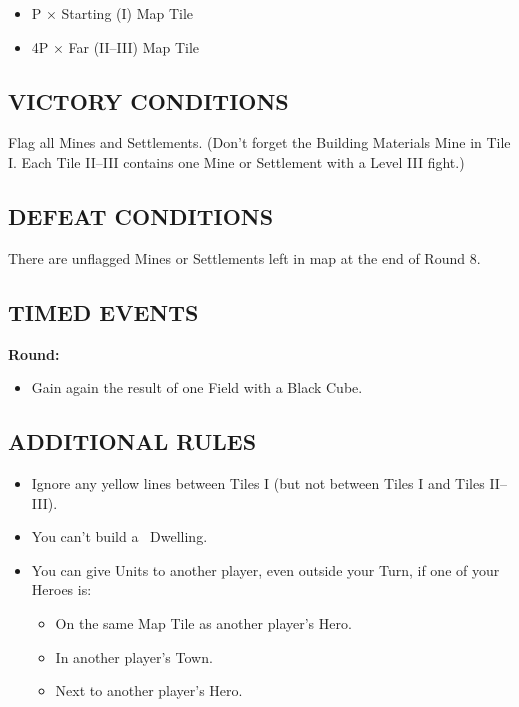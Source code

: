 \begin{multicols}{2}
\begin{itemize}
  \item P × Starting (I) Map Tile
  \item 4P × Far (II--III) Map Tile
\end{itemize}

\subsection*{\MakeUppercase{Victory Conditions}}

Flag all Mines and Settlements. (Don't forget the Building Materials Mine in Tile I. Each Tile II--III contains one Mine or Settlement with a Level III fight.)

\subsection*{\MakeUppercase{Defeat Conditions}}

There are unflagged Mines or Settlements left in map at the end of Round 8.

\subsection*{\MakeUppercase{Timed Events}}

\textbf{ Round:}
\begin{itemize}
  \item Gain again the result of one Field with a Black Cube.
\end{itemize}

\subsection*{\MakeUppercase{Additional Rules}}

\begin{itemize}
    \item Ignore any yellow lines between Tiles I (but not between Tiles I and Tiles II--III).

    \item You can't build a \golden\ Dwelling.

    \item You can give Units to another player, even outside your Turn, if one of your Heroes is:
    \begin{itemize}
        \item On the same Map Tile as another player's Hero.
        \item In another player's Town.
        \item Next to another player's Hero.
    \end{itemize}


\end{itemize}
\end{multicols}
